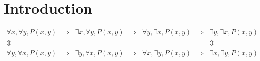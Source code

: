 \chapter{Introduction}

\[ 
    \begin{array}{ccccccc}  
        \forall x, \forall y, P(x,y) & \Rightarrow & \exists x, \forall y, P(x,y) & \Rightarrow & \forall y, \exists x, P(x,y) & \Rightarrow & \exists y, \exists x, P(x,y) \\
        \Updownarrow &&&&&& \Updownarrow \\
        \forall y, \forall x, P(x,y) & \Rightarrow & \exists y, \forall x, P(x,y) & \Rightarrow & \forall x, \exists y, P(x,y) & \Rightarrow & \exists x, \exists y, P(x,y)
    \end{array}
\]
